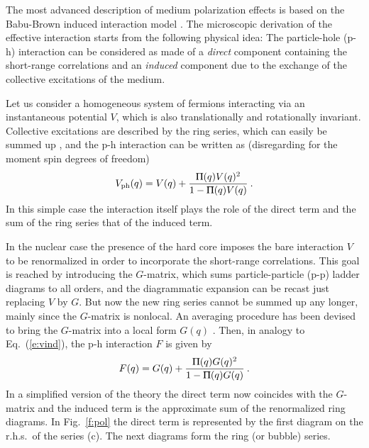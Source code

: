 \documentclass[runningheads]{svmult}
\newcommand{\greeksym}[1]{{\usefont{U}{psy}{m}{n}#1}}
\newcommand{\uPi}{\mbox{\greeksym{P}}}
\newcommand{\be}{\begin{equation}}
\newcommand{\ee}{\end{equation}}
\begin{document}
The most advanced description of medium polarization effects is based on the
Babu-Brown induced interaction model 
\cite{BABU,SJO73,BACK73,JACK82,DICK83,BACK85}. 
The microscopic derivation 
of the effective interaction starts from the following physical idea: 
The particle-hole (p-h) interaction can be considered as made of a 
{\em direct} component containing the short-range correlations and an 
{\em induced} component due to the exchange of the collective excitations 
of the medium.

Let us consider a homogeneous system of fermions interacting via an 
instantaneous potential $V$, which is also translationally and rotationally
invariant. 
Collective excitations are described by the ring series, which 
can easily be summed up \cite{FW}, and the p-h interaction can be written as
(disregarding for the moment spin degrees of freedom)
\be
 V_{\rm ph}(q) = V(q) + \frac{\uPi(q) V(q)^2}{1 - \uPi(q) V(q)}
\label{e:vind}  \:.
\ee
In this simple case the interaction itself plays the role of the direct term 
and the sum of the ring series that of the induced term.

In the nuclear case the presence of the hard core imposes the bare
interaction $V$ to be renormalized in order to incorporate the 
short-range correlations. 
This goal is reached by introducing the $G$-matrix,
which sums particle-particle (p-p) ladder diagrams to all orders, and the 
diagrammatic expansion can be recast just replacing $V$ by $G$. 
But now the new ring series cannot be summed up any longer, mainly
since the $G$-matrix is nonlocal. 
An averaging procedure 
has been devised to bring 
the $G$-matrix into a local form $G(q)$ \cite{SCHU}. 
Then, in analogy to Eq.~(\ref{e:vind}), the p-h interaction $F$ 
is given by
\be
 F(q) = G(q) + \frac{\uPi(q) G(q)^2}{1 - \uPi(q) G(q)}
\label{e:gind}  \:.
\ee   
In a simplified version of the theory the direct term now coincides with 
the $G$-matrix and the induced term is the approximate sum of the 
renormalized ring diagrams. 
In Fig.~\ref{f:pol} the direct term is represented by the first diagram 
on the r.h.s.~of the series (c). 
The next diagrams form the ring (or bubble) series. 
\end{document}

